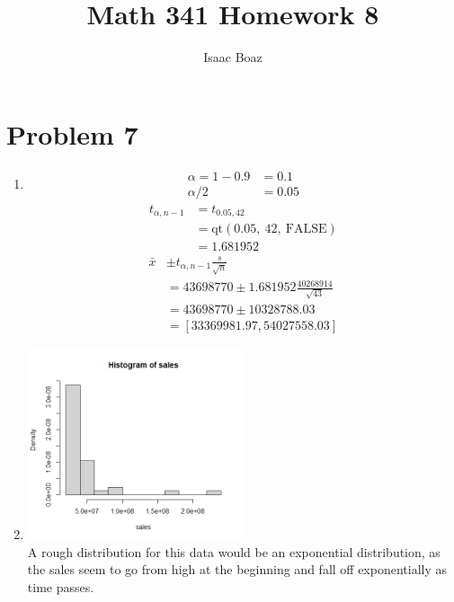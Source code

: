 \documentclass{article}
\title{\vspace{-4ex}Math 341 Homework 8}
\author{Isaac Boaz}
\begin{document}
\maketitle
\section*{Problem 7}
\begin{enumerate}[label=(\alph*)]
    \item \begin{align*}
              \alpha = 1 - 0.9 & = 0.1  \\
              \alpha/2         & = 0.05
          \end{align*}
          \begin{align*}
              t_{\alpha, n-1} & = t_{0.05, 42}                        \\
                              & = \text{qt}(0.05,\ 42,\ \text{FALSE}) \\
                              & = 1.681952
          \end{align*}
          \begin{align*}
              \bar{x} & \pm t_{\alpha, n-1} \frac{s}{\sqrt{n}}             \\
                      & = 43698770 \pm 1.681952 \frac{40268914}{\sqrt{43}} \\
                      & = 43698770 \pm 10328788.03                         \\
                      & = [33369981.97, 54027558.03]
          \end{align*}
    \item \includegraphics[width=0.5\textwidth]{histogram.png} \\
          A rough distribution for this data would be an exponential distribution, as the sales seem to go from high at the beginning and fall off exponentially as time passes.

\end{enumerate}
\end{document}
